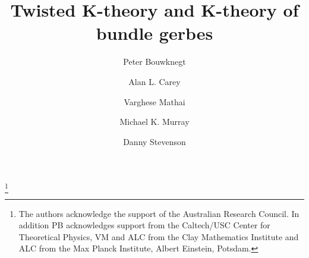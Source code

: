 \documentclass[a4paper,reqno]{amsart}
\theoremstyle{plain}
\theoremstyle{definition}
\theoremstyle{remark}
\numberwithin{equation}{section}
\numberwithin{figure}{section}
\newcommand{\<}{\langle}
\renewcommand{\>}{\rangle}
\begin{document}
\title[Twisted K-theory and K-theory of bundle gerbes]{Twisted K-theory
and K-theory of bundle gerbes}



\author[P. Bouwknegt]{Peter Bouwknegt}
\address[Peter Bouwknegt]
{Department of Physics and Mathematical Physics
and Department of Pure Mathematics\\
University of Adelaide\\
Adelaide, SA 5005 \\
Australia}

\author[A.L. Carey]{Alan L. Carey}
\address[Alan L. Carey]
{Department of Pure Mathematics\\
University of Adelaide\\
Adelaide, SA 5005 \\
Australia}


\author[V. Mathai]{Varghese Mathai}
\address[Varghese Mathai]
{Department of Mathematics\\
MIT \\
Cambridge, MA 02139 \\
USA and Department of Pure Mathematics\\
University of Adelaide\\
Adelaide, SA 5005 \\
Australia}


\author[M.K. Murray]{Michael K. Murray}
\address[Michael K. Murray]
{Department of Pure Mathematics\\
University of Adelaide\\
Adelaide, SA 5005 \\
Australia}

\author[D. Stevenson]{Danny Stevenson}
\address[Danny Stevenson]
{Department of Pure Mathematics\\
University of Adelaide\\
Adelaide, SA 5005 \\
Australia}


\thanks{The authors acknowledge the support of the Australian
Research Council.  In addition PB acknowledges support from the
Caltech/USC Center for Theoretical Physics, VM and ALC from the
Clay Mathematics Institute and ALC from the Max Planck Institute,
Albert Einstein, Potsdam.}

\end{document}
